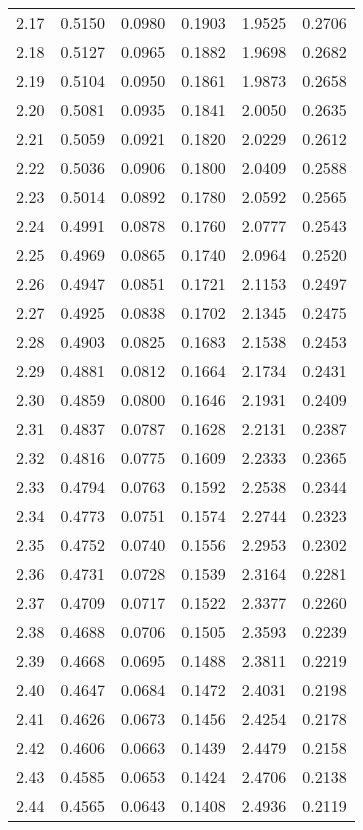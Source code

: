 \documentclass{article}
\begin{document}
\begin{longtable}{cccccc}
2.17 & 0.5150 & 0.0980 & 0.1903 & 1.9525 & 0.2706 \\
2.18 & 0.5127 & 0.0965 & 0.1882 & 1.9698 & 0.2682 \\
2.19 & 0.5104 & 0.0950 & 0.1861 & 1.9873 & 0.2658 \\
2.20 & 0.5081 & 0.0935 & 0.1841 & 2.0050 & 0.2635 \\
2.21 & 0.5059 & 0.0921 & 0.1820 & 2.0229 & 0.2612 \\
2.22 & 0.5036 & 0.0906 & 0.1800 & 2.0409 & 0.2588 \\
2.23 & 0.5014 & 0.0892 & 0.1780 & 2.0592 & 0.2565 \\
2.24 & 0.4991 & 0.0878 & 0.1760 & 2.0777 & 0.2543 \\
2.25 & 0.4969 & 0.0865 & 0.1740 & 2.0964 & 0.2520 \\
2.26 & 0.4947 & 0.0851 & 0.1721 & 2.1153 & 0.2497 \\
2.27 & 0.4925 & 0.0838 & 0.1702 & 2.1345 & 0.2475 \\
2.28 & 0.4903 & 0.0825 & 0.1683 & 2.1538 & 0.2453 \\
2.29 & 0.4881 & 0.0812 & 0.1664 & 2.1734 & 0.2431 \\
2.30 & 0.4859 & 0.0800 & 0.1646 & 2.1931 & 0.2409 \\
2.31 & 0.4837 & 0.0787 & 0.1628 & 2.2131 & 0.2387 \\
2.32 & 0.4816 & 0.0775 & 0.1609 & 2.2333 & 0.2365 \\
2.33 & 0.4794 & 0.0763 & 0.1592 & 2.2538 & 0.2344 \\
2.34 & 0.4773 & 0.0751 & 0.1574 & 2.2744 & 0.2323 \\
2.35 & 0.4752 & 0.0740 & 0.1556 & 2.2953 & 0.2302 \\
2.36 & 0.4731 & 0.0728 & 0.1539 & 2.3164 & 0.2281 \\
2.37 & 0.4709 & 0.0717 & 0.1522 & 2.3377 & 0.2260 \\
2.38 & 0.4688 & 0.0706 & 0.1505 & 2.3593 & 0.2239 \\
2.39 & 0.4668 & 0.0695 & 0.1488 & 2.3811 & 0.2219 \\
2.40 & 0.4647 & 0.0684 & 0.1472 & 2.4031 & 0.2198 \\
2.41 & 0.4626 & 0.0673 & 0.1456 & 2.4254 & 0.2178 \\
2.42 & 0.4606 & 0.0663 & 0.1439 & 2.4479 & 0.2158 \\
2.43 & 0.4585 & 0.0653 & 0.1424 & 2.4706 & 0.2138 \\
2.44 & 0.4565 & 0.0643 & 0.1408 & 2.4936 & 0.2119 \\

\end{longtable}
\end{document}
